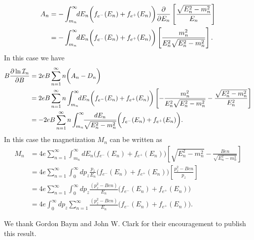 \documentclass[sn-mathphys,Numbered]{sn-jnl}
\begin{document}
\begin{align}
A_n&=-\int_{m_n}^\infty\!\!dE_n \bigg(f_{e^-}(E_n)+f_{e^+}(E_n)\bigg)\frac{\partial}{\partial E_n}\left[\frac{\sqrt{E^2_n-m^2_n}}{E_{n}}\right]\notag\\
&=-\int_{m_n}^\infty\!\!dE_n \bigg(f_{e^-}(E_n)+f_{e^+}(E_n)\bigg)\left[\frac{m^2_n}{E^2_{n}\sqrt{E^2_n-m^2_n}}\right].
\end{align}
In this case we have
\begin{align}
B\frac{\partial\ln\mathcal{I}_n}{\partial B}&=2eB\sum_{n=1}^\infty n\bigg(A_n-D_n\bigg)\notag\\
&=2eB\sum_{n=1}^\infty n\int_{m_n}^\infty\!\!dE_n \bigg(f_{e^-}(E_n)+f_{e^+}(E_n)\bigg)\left[-\frac{m^2_n}{E^2_{n}\sqrt{E^2_n-m^2_n}}-\frac{\sqrt{E^2_n-m^2_n}}{E^2_{n}}\right]\notag\\
&=-2eB\sum_{n=1}^\infty n\int_{m_n}^\infty\!\!\frac{dE_n}{\sqrt{E^2_n-m^2_n}} \bigg(f_{e^-}(E_n)+f_{e^+}(E_n)\bigg).
\end{align}
In this case the magnetization $M_n$ can be written as
\begin{align}
M_n&=4e\sum_{n=1}^\infty \int_{m_n}^\infty\!\!dE_n\bigg(f_{e^-}(E_n)+f_{e^+}(E_n)\bigg)\left[{\sqrt{E^2_n-m^2_n}}-\frac{Ben}{\sqrt{E^2_n-m^2_n}}\right]\\
&=4e\sum_{n=1}^\infty \int_{0}^\infty\!\!dp_z\frac{p_z}{E_n}\bigg(f_{e^-}(E_n)+f_{e^+}(E_n)\bigg)\left[\frac{p_z^2-Ben}{p_z}\right]\\
&=4e\sum_{n=1}^\infty \int_{0}^\infty\!\!dp_z\frac{(p_z^2-Ben)}{E_n}\bigg(f_{e^-}(E_n)+f_{e^+}(E_n)\bigg)\\
&=4e \int_{0}^\infty\!\!dp_z\sum_{n=1}^\infty\frac{(p_z^2-Ben)}{E_n}\bigg(f_{e^-}(E_n)+f_{e^+}(E_n)\bigg).
\end{align}





\backmatter

We thank Gordon Baym and John W. Clark for their encouragement to publish this result.

%

\end{document}
